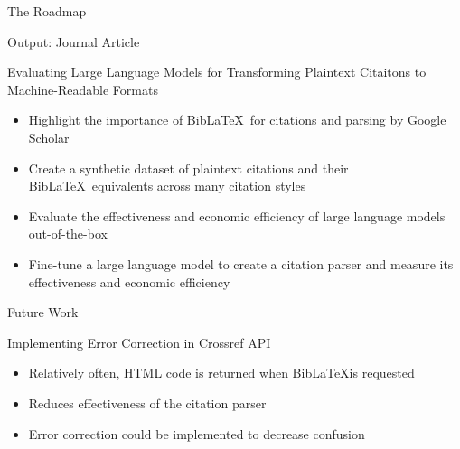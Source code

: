 \documentclass[aspectratio=169,9pt,xcolor=dvipsnames]{beamer}
\begin{document}
\begin{frame}{The Roadmap}
    \begin{center}
    \end{center}
\end{frame}


\begin{frame}{Output: Journal Article}
    \begin{block}{Evaluating Large Language Models for Transforming Plaintext Citaitons to Machine-Readable Formats}
        \begin{itemize}
            \item Highlight the importance of Bib\LaTeX\ for citations and parsing by Google Scholar
            \item Create a synthetic dataset of plaintext citations and their Bib\LaTeX\ equivalents across many citation styles
            \item Evaluate the effectiveness and economic efficiency of large language models out-of-the-box
            \item Fine-tune a large language model to create a citation parser and measure its effectiveness and economic efficiency
        \end{itemize}
        
    \end{block}
\end{frame}


\begin{frame}{Future Work}
    \begin{block}{Implementing Error Correction in Crossref API}
        \begin{itemize}
            \item Relatively often, HTML code is returned when Bib\LaTeX is requested
            \item Reduces effectiveness of the citation parser
            \item Error correction could be implemented to decrease confusion
        \end{itemize}
    \end{block}
\end{frame}


\end{document}
